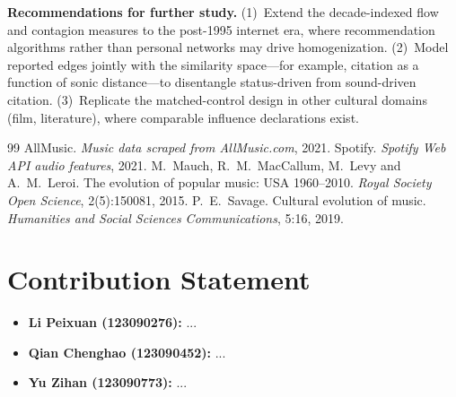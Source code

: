 \documentclass[11pt,letterpaper]{article}
\numberwithin{equation}{section}
\begin{document}
\noindent\textbf{Recommendations for further study.}
(1)~Extend the decade-indexed flow and contagion measures to the
post-1995 internet era, where recommendation algorithms rather than
personal networks may drive homogenization.
(2)~Model reported edges jointly with the similarity space---for example,
citation as a function of sonic distance---to disentangle status-driven
from sound-driven citation.
(3)~Replicate the matched-control design in other cultural domains (film,
literature), where comparable influence declarations exist.

\newpage
\begin{thebibliography}{99}
 AllMusic. \emph{Music data scraped from AllMusic.com}, 2021.
 Spotify. \emph{Spotify Web API audio features}, 2021.
  M.~Mauch, R.~M.~MacCallum, M.~Levy and A.~M.~Leroi.
  The evolution of popular music: USA 1960--2010.
  \emph{Royal Society Open Science}, 2(5):150081, 2015.
  P.~E.~Savage.
  Cultural evolution of music.
  \emph{Humanities and Social Sciences Communications}, 5:16, 2019.
\end{thebibliography}

\newpage
\section*{Contribution Statement}
\begin{itemize}
  \item \textbf{Li Peixuan (123090276):} ...
  \item \textbf{Qian Chenghao (123090452):} ...
  \item \textbf{Yu Zihan (123090773):} ...
\end{itemize}
\end{document}
